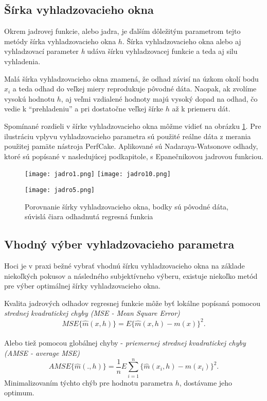 \subsection{Šírka vyhladzovacieho okna}

Okrem jadrovej funkcie, alebo jadra, je ďalším dôležitým parametrom tejto metódy šírka vyhladzovacieho okna $h$. Šírka vyhladzovacieho okna alebo aj vyhladzovací parameter \textit{h} udáva šírku vyhladzovacej funkcie a teda aj silu vyhladenia. 

Malá šírka vyhladzovacieho okna znamená, že odhad závisí na úzkom okolí bodu $x_i$ a teda odhad do veľkej miery reprodukuje pôvodné dáta. Naopak, ak zvolíme vysokú hodnotu $h$, aj veľmi vzdialené hodnoty majú vysoký dopad na odhad, čo vedie k ``prehladeniu'' a pri dostatočne veľkej šírke $h$ až k priemeru dát.

 Spomínané rozdieli v šírke vyhladzovacieho okna môžme vidieť na obrázku \ref{porovnanieSirky}. Pre ilustráciu vplyvu vyhladzovacieho parametra sú použité reálne dáta z merania použitej pamäte nástroja PerfCake. Aplikované sú Nadaraya-Watsonove odhady, ktoré sú popísané v nasledujúcej podkapitole, s Epanečnikovou jadrovou funkciou. 
 
 \begin{figure}[!ht]
  \texttt{[image: jadro1.png]}
  \hspace{15px}
  \texttt{[image: jadro10.png]}
   
   \vspace{30px}
   
  \centering
  \texttt{[image: jadro5.png]}
  \caption{Porovnanie šírky vyhladzovacieho okna, bodky sú pôvodné dáta, súvislá čiara odhadnutá regresná funkcia}\label{porovnanieSirky}
\end{figure}

\subsection{Vhodný výber vyhladzovacieho parametra}
Hoci je v praxi bežné vybrať vhodnú šírku vyhladzovacieho okna na základe niekoľkých pokusov a následného subjektívneho výberu, existuje niekoľko metód pre výber optimálnej šírky vyhladzovacieho okna.

Kvalita jadrových odhadov regresnej funkcie môže byť lokálne popísaná pomocou \textit{strednej kvadratickej chyby (MSE - Mean Square Error)}
\begin{equation*}
MSE\{\hat{m}(x,h)\} = E{\{\hat{m}(x,h) - m(x)\}}^2.
\end{equation*} 
\\
Alebo tiež pomocou globálnej chyby - \textit{priemernej strednej kvadratickej chyby (AMSE - average MSE)}
\begin{equation*}
AMSE\{\hat{m}(.,h)\} = \frac{1}{n}E\sum\limits_{i=1}^{n} {\{\hat{m}(x_i,h) - m(x_i)\}}^2.
\end{equation*}
Minimalizovaním týchto chýb pre hodnotu parametra $h$, dostávame jeho optimum.


